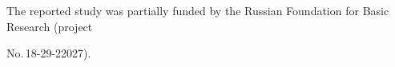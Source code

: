   


  

  

  




\vspace*{-16pt}



\Ack

  \noindent

  The reported study was partially funded by the Russian Foundation for Basic Research (project 

No.\,18-29-22027).












